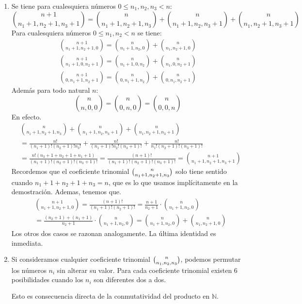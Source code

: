 \documentclass{article}
\theoremstyle{plain}
\theoremstyle{definition}
\begin{document}
\begin{enumerate}
    \item Se tiene para cualesquiera números $0 \le n_1, n_2, n_3 < n$:
    \[
    \binom{n+1}{n_1 + 1, n_2 + 1, n_3 + 1}
    = 
    \binom{n}{n_1 + 1, n_2 + 1, n_3}
    +
    \binom{n}{n_1 + 1, n_2, n_3 + 1}
    +
    \binom{n}{n_1, n_2 + 1, n_3 + 1}
    \]
    Para cualesquiera números $0 \le n_1, n_2 < n$ se tiene:
    \begin{align*}
        \binom{n+1}{n_1 + 1, n_2 + 1, 0}
        =
        \binom{n}{n_1 + 1, n_2, 0}
        +
        \binom{n}{n_1, n_2 + 1, 0} \\
        \binom{n+1}{n_1 + 1, 0, n_2 + 1}
        =
        \binom{n}{n_1 + 1, 0, n_2}
        +
        \binom{n}{n_1, 0, n_2 + 1} \\
        \binom{n+1}{0, n_1 + 1, n_2 + 1}
        =
        \binom{n}{0, n_1 + 1, n_2}
        +
        \binom{n}{0, n_1, n_2 + 1}
    \end{align*}
    Además para todo natural $n$:
    \[
    \binom{n}{n, 0, 0}
    =
    \binom{n}{0, n, 0}
    =
    \binom{n}{0, 0, n}
    \]
    En efecto.
    \begin{align*}
        &\binom{n}{n_1 + 1, n_2 + 1, n_3}
        +
        \binom{n}{n_1 + 1, n_2, n_3 + 1}
        +
        \binom{n}{n_1, n_2 + 1, n_3 + 1} \\
        &= 
        \frac{n!}{(n_1+1)!(n_2+1)!n_3!}
        +
        \frac{n!}{(n_1+1)!n_2!(n_3+1)!}
        +
        \frac{n!}{n_1!(n_2+1)!(n_3+1)!} \\
        &= 
        \frac{n!(n_3 + 1 + n_2 + 1 + n_1 + 1)}{(n_1+1)!(n_2+1)!(n_3+1)!}
        =
        \frac{(n+1)!}{(n_1+1)!(n_2+1)!(n_3+1)!}
        =
        \binom{n+1}{n_1 + 1, n_2 + 1, n_3 + 1}
    \end{align*}
    Recordemos que el coeficiente trinomial $\tbinom{n}{n_1 + 1, n_2 + 1, n_3}$ solo tiene sentido cuando
    $n_1 + 1 + n_2 + 1 + n_3 = n$, que es lo que usamos implícitamente en la demostración.
    Ademas, tenemos que.
    \begin{align*}
        &\binom{n+1}{n_1 + 1, n_2 + 1, 0}
        =
        \frac{(n+1)!}{(n_1+1)!(n_2+1)!}
        =
        \frac{n + 1}{n_2 + 1}\cdot\binom{n}{n_1 + 1, n_2, 0} \\
        &=
        \frac{(n_2 + 1) + (n_1 + 1)}{n_2 + 1}\cdot\binom{n}{n_1 + 1, n_2, 0} 
        =
        \binom{n}{n_1 + 1, n_2, 0} + \binom{n}{n_1, n_2 + 1, 0}
    \end{align*}
    Los otros dos casos se razonan analogamente. La última identidad es inmediata.
    \item Si consideramos cualquier coeficiente trinomial $\tbinom{n}{n_1, n_2, n_3}$,
    podemos permutar los números $n_i$ sin alterar su valor. Para cada coeficiente trinomial 
    existen 6 posibilidades cuando los $n_i$ son diferentes dos a dos.

    Esto es consecuencia directa de la conmutatividad del producto en $\mathbb{N}$.
\end{enumerate}
\end{document}

